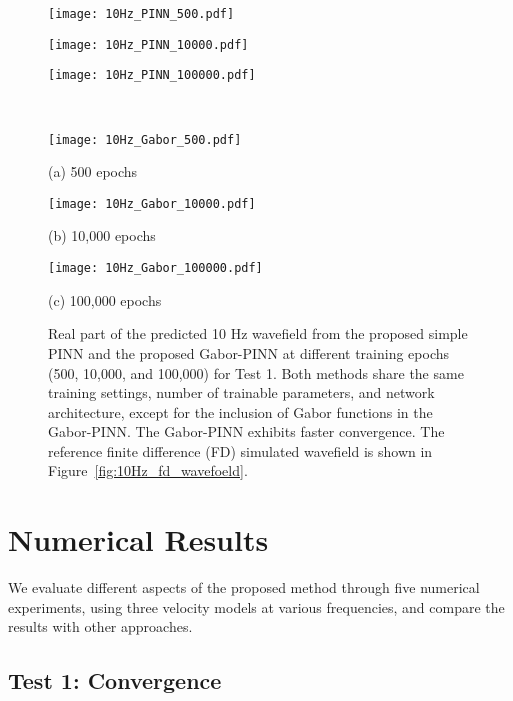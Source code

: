 \documentclass[authoryear, preprint, 12pt]{elsarticle}
\begin{document}
		\begin{figure}[tp]
		\centering
		\begin{minipage}{0.30\textwidth}
			\centering
			\texttt{[image: 10Hz\_PINN\_500.pdf]}
		\end{minipage}
		\begin{minipage}{0.30\textwidth}
			\centering
			\texttt{[image: 10Hz\_PINN\_10000.pdf]}
		\end{minipage}
		\begin{minipage}{0.30\textwidth}
			\centering
			\texttt{[image: 10Hz\_PINN\_100000.pdf]}
		\end{minipage}
		\\
		\begin{minipage}{0.30\textwidth}
			\centering
			\texttt{[image: 10Hz\_Gabor\_500.pdf]}
			\caption*{(a) 500 epochs}
		\end{minipage}
		\begin{minipage}{0.30\textwidth}
			\centering
			\texttt{[image: 10Hz\_Gabor\_10000.pdf]}
			\caption*{(b) 10,000 epochs}
		\end{minipage}
		\begin{minipage}{0.30\textwidth}
			\centering
			\texttt{[image: 10Hz\_Gabor\_100000.pdf]}
			\caption*{(c) 100,000 epochs}
		\end{minipage}
\caption{Real part of the predicted 10 Hz wavefield from the proposed simple PINN and the proposed Gabor-PINN at different training epochs (500, 10,000, and 100,000) for Test 1. Both methods share the same training settings, number of trainable parameters, and network architecture, except for the inclusion of Gabor functions in the Gabor-PINN. The Gabor-PINN exhibits faster convergence. The reference finite difference (FD) simulated wavefield is shown in Figure~\ref{fig:10Hz_fd_wavefoeld}.}
\label{fig:predictions_10Hz}

	\end{figure}

\section{Numerical Results}

We evaluate different aspects of the proposed method through five numerical experiments, using three velocity models at various frequencies, and compare the results with other approaches.

	\subsection{Test 1: Convergence}
	
\end{document}
